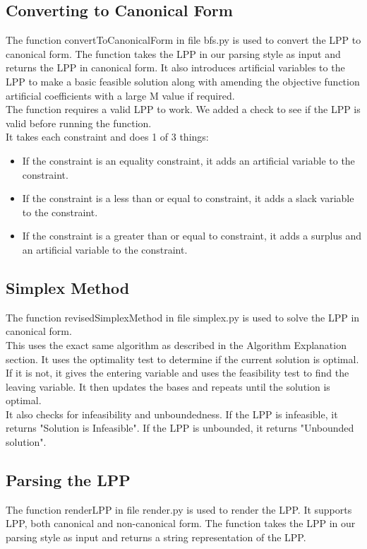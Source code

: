 \documentclass{article}
\numberwithin{equation}{section}
\begin{document}
\subsection{Converting to Canonical Form}
The function convertToCanonicalForm in file bfs.py is used to convert the LPP to canonical form. The function takes the LPP in our parsing style as input and returns the LPP in canonical form. It also introduces artificial variables to the LPP to make a basic feasible solution along with amending the objective function artificial coefficients with a large M value if required.\\
The function requires a valid LPP to work. We added a check to see if the LPP is valid before running the function.\\
It takes each constraint and does 1 of 3 things:
\begin{itemize}
    \item If the constraint is an equality constraint, it adds an artificial variable to the constraint.
    \item If the constraint is a less than or equal to constraint, it adds a slack variable to the constraint.
    \item If the constraint is a greater than or equal to constraint, it adds a surplus and an artificial variable to the constraint.
\end{itemize}

\subsection{Simplex Method}
The function revisedSimplexMethod in file simplex.py is used to solve the LPP in canonical form.\\ 
This uses the exact same algorithm as described in the Algorithm Explanation section. It uses the optimality test to determine if the current solution is optimal. If it is not, it gives the entering variable and uses the feasibility test to find the leaving variable. It then updates the bases and repeats until the solution is optimal.\\
It also checks for infeasibility and unboundedness. If the LPP is infeasible, it returns "Solution is Infeasible". If the LPP is unbounded, it returns "Unbounded solution".

\subsection{Parsing the LPP}
The function renderLPP in file render.py is used to render the LPP. It supports LPP, both canonical and non-canonical form. The function takes the LPP in our parsing style as input and returns a string representation of the LPP.
\end{document}

